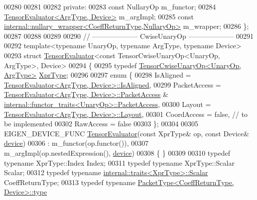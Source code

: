 \begin{DoxyCode}
00280 
00281 
00282  \textcolor{keyword}{private}:
00283   \textcolor{keyword}{const} NullaryOp m\_functor;
00284   \hyperlink{struct_eigen_1_1_tensor_evaluator}{TensorEvaluator<ArgType, Device>} m\_argImpl;
00285   \textcolor{keyword}{const} \hyperlink{struct_eigen_1_1internal_1_1nullary__wrapper}{internal::nullary\_wrapper<CoeffReturnType,NullaryOp>}
       m\_wrapper;
00286 \};
00287 
00288 
00289 
00290 \textcolor{comment}{// -------------------- CwiseUnaryOp --------------------}
00291 
00292 \textcolor{keyword}{template}<\textcolor{keyword}{typename} UnaryOp, \textcolor{keyword}{typename} ArgType, \textcolor{keyword}{typename} Device>
00293 \textcolor{keyword}{struct }\hyperlink{struct_eigen_1_1_tensor_evaluator}{TensorEvaluator}<const TensorCwiseUnaryOp<UnaryOp, ArgType>, Device>
00294 \{
00295   \textcolor{keyword}{typedef} \hyperlink{class_eigen_1_1_tensor_cwise_unary_op}{TensorCwiseUnaryOp<UnaryOp, ArgType>} 
      \hyperlink{class_eigen_1_1_tensor_cwise_nullary_op}{XprType};
00296 
00297   \textcolor{keyword}{enum} \{
00298     IsAligned = \hyperlink{struct_eigen_1_1_tensor_evaluator}{TensorEvaluator<ArgType, Device>::IsAligned},
00299     PacketAccess = \hyperlink{struct_eigen_1_1_tensor_evaluator}{TensorEvaluator<ArgType, Device>::PacketAccess}
       & \hyperlink{struct_eigen_1_1internal_1_1functor__traits}{internal::functor\_traits<UnaryOp>::PacketAccess},
00300     Layout = \hyperlink{struct_eigen_1_1_tensor_evaluator}{TensorEvaluator<ArgType, Device>::Layout},
00301     CoordAccess = \textcolor{keyword}{false},  \textcolor{comment}{// to be implemented}
00302     RawAccess = \textcolor{keyword}{false}
00303   \};
00304 
00305   EIGEN\_DEVICE\_FUNC \hyperlink{struct_eigen_1_1_tensor_evaluator}{TensorEvaluator}(\textcolor{keyword}{const} XprType& op, \textcolor{keyword}{const} Device& 
      \hyperlink{struct_eigen_1_1_tensor_evaluator_a98b51809ed8f7a1f736eb7b952b9636e}{device})
00306     : m\_functor(op.functor()),
00307       m\_argImpl(op.nestedExpression(), \hyperlink{struct_eigen_1_1_tensor_evaluator_a98b51809ed8f7a1f736eb7b952b9636e}{device})
00308   \{ \}
00309 
00310   \textcolor{keyword}{typedef} \textcolor{keyword}{typename} XprType::Index Index;
00311   \textcolor{keyword}{typedef} \textcolor{keyword}{typename} XprType::Scalar Scalar;
00312   \textcolor{keyword}{typedef} \textcolor{keyword}{typename} \hyperlink{struct_eigen_1_1internal_1_1traits}{internal::traits<XprType>::Scalar} CoeffReturnType;
00313   \textcolor{keyword}{typedef} \textcolor{keyword}{typename} \hyperlink{group___sparse_core___module}{PacketType<CoeffReturnType, Device>::type} 

\end{DoxyCode}

